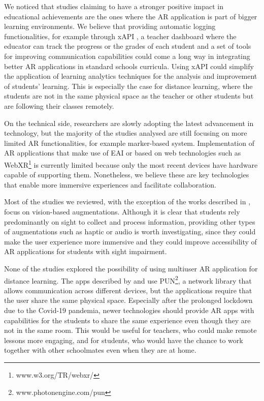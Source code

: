 We noticed that studies claiming to have a stronger positive impact in educational achievements are the ones where the \gls{AR} application is part of bigger learning environments. We believe that providing automatic logging functionalities, for example through xAPI \citep{kevan2016experience}, a teacher dashboard where the educator can track the progress or the grades of each student and a set of tools for improving communication capabilities could come a long way in integrating better \gls{AR} applications in standard schools curricula. Using xAPI could simplify the application of learning analytics techniques for the analysis and improvement of students' learning. This is especially the case for distance learning, where the students are not in the same physical space as the teacher or other students but are following their classes remotely.

On the technical side, researchers are slowly adopting the latest advancement in technology, but the majority of the studies analysed are still focusing on more limited \gls{AR} functionalities, for example marker-based system. Implementation of \gls{AR} applications that make use of \gls{EAI} or based on web technologies such as WebXR\footnote{www.w3.org/TR/webxr/} is currently limited because only the most recent devices have hardware capable of supporting them. Nonetheless, we believe these are key technologies that enable more immersive experiences and facilitate collaboration. 

Most of the studies we reviewed, with the exception of the works described in \citep{chen2018application, kenoui2020teach, mikulowski2020multi}, focus on vision-based augmentations. Although it is clear that students rely predominantly on sight to collect and process information, providing other types of augmentations such as haptic or audio is worth investigating, since they could make the user experience more immersive and they could improve accessibility of \gls{AR} applications for students with sight impairment.

None of the studies explored the possibility of using multiuser AR application for distance learning. The apps described by \citet{oh2017hybrid} and \citet{lopez2020emofindar} use PUN\footnote{www.photonengine.com/pun}, a network library that allows communication across different devices, but the applications require that the user share the same physical space. Especially after the prolonged lockdown due to the Covid-19 pandemia, newer technologies should provide AR apps with capabilities for the students to share the same experience even though they are not in the same room. This would be useful for teachers, who could make remote lessons more engaging, and for students, who would have the chance to work together with other schoolmates even when they are at home.  

